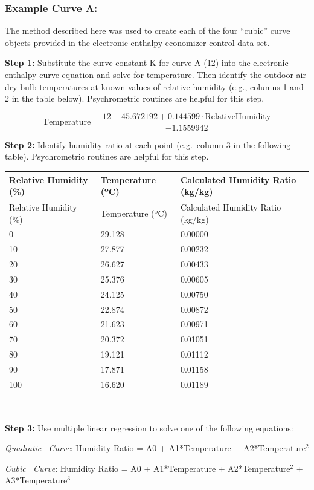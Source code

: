 \subsubsection{Example Curve A:}\label{example-curve-a}

The method described here was used to create each of the four ``cubic'' curve objects provided in the electronic enthalpy economizer control data set.

\textbf{Step 1:} Substitute the curve constant K for curve A (12) into the electronic enthalpy curve equation and solve for temperature. Then identify the outdoor air dry-bulb temperatures at known values of relative humidity (e.g., columns 1 and 2 in the table below). Psychrometric routines are helpful for this step.

\begin{equation}
\text{Temperature} = \frac{12 - 45.672192 + 0.144599 \cdot \text{RelativeHumidity}}{-1.1559942}
\end{equation}

\textbf{Step 2:} Identify humidity ratio at each point (e.g.~column 3 in the following table). Psychrometric routines are helpful for this step.

\begin{longtable}[c]{p{1.78in}p{1.5in}p{2.71in}}
\toprule 
Relative Humidity (\%) & Temperature (ºC) & Calculated Humidity Ratio (kg/kg) \tabularnewline
\midrule
\endfirsthead

\toprule 
Relative Humidity (\%) & Temperature (ºC) & Calculated Humidity Ratio (kg/kg) \tabularnewline
\midrule
\endhead

0 & 29.128 & 0.00000 \tabularnewline
10 & 27.877 & 0.00232 \tabularnewline
20 & 26.627 & 0.00433 \tabularnewline
30 & 25.376 & 0.00605 \tabularnewline
40 & 24.125 & 0.00750 \tabularnewline
50 & 22.874 & 0.00872 \tabularnewline
60 & 21.623 & 0.00971 \tabularnewline
70 & 20.372 & 0.01051 \tabularnewline
80 & 19.121 & 0.01112 \tabularnewline
90 & 17.871 & 0.01158 \tabularnewline
100 & 16.620 & 0.01189 \tabularnewline
\bottomrule
\end{longtable}

\textbf{~}

\textbf{Step 3:} Use multiple linear regression to solve one of the following equations:

\emph{Quadratic~ Curve}: Humidity Ratio = A0 + A1*Temperature + A2*Temperature\(^{2}\)

\emph{Cubic~ Curve}: Humidity Ratio = A0 + A1*Temperature + A2*Temperature\(^{2}\) + A3*Temperature\(^{3}\)

